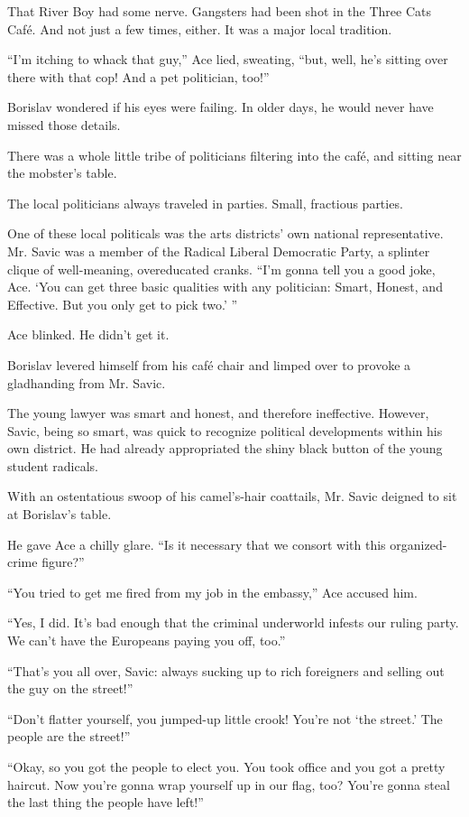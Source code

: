 \documentclass[20 pt,twoside,extrafontsizes,final]{memoir}
\begin{document}
That River Boy had some nerve. Gangsters had been shot in the Three Cats Caf\'e. And not just a few times, either. It was a major local tradition.

``I'm itching to whack that guy,'' Ace lied, sweating, ``but, well, he's sitting over there with that cop! And a pet politician, too!''

Borislav wondered if his eyes were failing. In older days, he would never have missed those details.

There was a whole little tribe of politicians filtering into the caf\'e, and sitting near the mobster's table.

The local politicians always traveled in parties. Small, fractious parties.

One of these local politicals was the arts districts' own national representative. Mr. Savic was a member of the Radical Liberal Democratic Party, a splinter clique of well-meaning, overeducated cranks. ``I'm gonna tell you a good joke, Ace. `You can get three basic qualities with any politician: Smart, Honest, and Effective. But you only get to pick two.' ''

Ace blinked. He didn't get it.

Borislav levered himself from his caf\'e chair and limped over to provoke a gladhanding from Mr. Savic.

The young lawyer was smart and honest, and therefore ineffective. However, Savic, being so smart, was quick to recognize political developments within his own district. He had already appropriated the shiny black button of the young student radicals.

With an ostentatious swoop of his camel's-hair coattails, Mr. Savic deigned to sit at Borislav's table.

He gave Ace a chilly glare. ``Is it necessary that we consort with this organized-crime figure?''

``You tried to get me fired from my job in the embassy,'' Ace accused him.

``Yes, I did. It's bad enough that the criminal underworld infests our ruling party. We can't have the Europeans paying you off, too.''

``That's you all over, Savic: always sucking up to rich foreigners and selling out the guy on the street!''

``Don't flatter yourself, you jumped-up little crook! You're not `the street.' The people are the street!''

``Okay, so you got the people to elect you. You took office and you got a pretty haircut. Now you're gonna wrap yourself up in our flag, too? You're gonna steal the last thing the people have left!''
\end{document}
